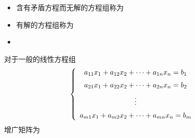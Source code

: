 \begin{frame}
  \begin{itemize}
  \item 含有矛盾方程而无解的方程组称为 \\[0.2cm]
  \item 有解的方程组称为  \\[0.2cm]
  \item {}
  \end{itemize}
\end{frame}



\begin{frame}
  \begin{footnotesize}
    对于一般的线性方程组
    $$
    \left\{
    \begin{array}{c}
      a_{11}x_1 + a_{12}x_2 + \cdots + a_{1n}x_n = b_1\\[0.2cm]
      a_{21}x_1 + a_{22}x_2 + \cdots + a_{2n}x_n = b_2\\[0.2cm]
      \vdots\\[0.2cm]
      a_{m1}x_1 + a_{m2}x_2 + \cdots + a_{mn}x_n = b_m
    \end{array}
    \right.
    $$
    增广矩阵为
    \begin{figure}
      
    \end{figure}
  \end{footnotesize}
\end{frame}


